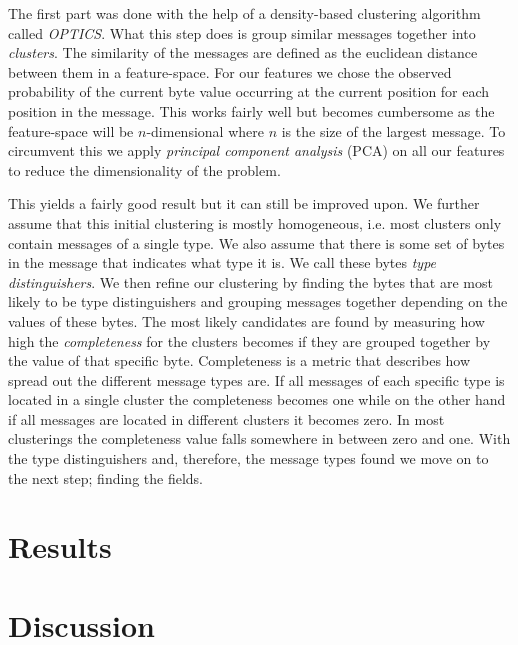 \documentclass[a4paper,twocolumn]{article}
\begin{document}
The first part was done with the help of a density-based clustering algorithm
called \emph{OPTICS}. What this step does is group similar messages together into
\emph{clusters}. The similarity of the messages are defined as the euclidean
distance between them in a feature-space. For our features we chose the
observed probability of the current byte value occurring at the current
position for each position in the message. This works fairly well but becomes
cumbersome as the feature-space will be $n$-dimensional where $n$ is the size
of the largest message. To circumvent this we apply
\emph{principal component analysis} (PCA) on all our features to reduce the
dimensionality of the problem.

This yields a fairly good result but it can still be improved upon. We further
assume that this initial clustering is mostly homogeneous, i.e. most clusters
only contain messages of a single type. We also assume that there is some set
of bytes in the message that indicates what type it is. We call these bytes
\emph{type distinguishers}. We then refine our clustering by finding the bytes
that are most likely to be type distinguishers and grouping messages together
depending on the values of these bytes. The most likely candidates are found by
measuring how high the \emph{completeness} for the clusters becomes if they are
grouped together by the value of that specific byte. Completeness is a metric
that describes how spread out the different message types are. If all messages
of each specific type is located in a single cluster the completeness becomes
one while on the other hand if all messages are located in different clusters
it becomes zero. In most clusterings the completeness value falls somewhere
in between zero and one. With the type distinguishers and, therefore, the
message types found we move on to the next step; finding the fields.

\section{Results}

\section{Discussion}
\end{document}
